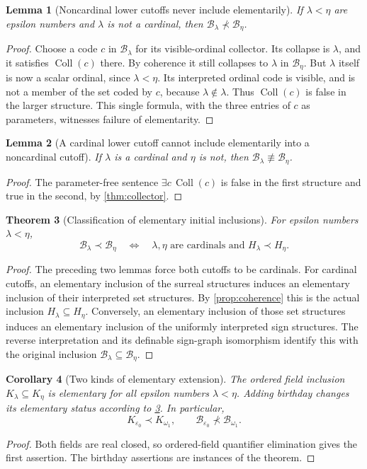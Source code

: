 \documentclass[11pt,letterpaper]{article}
\newtheorem{theorem}{Theorem}[section]
\newtheorem{lemma}[theorem]{Lemma}
\newtheorem{corollary}[theorem]{Corollary}
\theoremstyle{definition}
\theoremstyle{remark}
\newcommand{\B}{\mathcal B}
\newcommand{\Coll}{\operatorname{Coll}}
\begin{document}
\begin{lemma}[Noncardinal lower cutoffs never include elementarily]
\label{lem:lower-noncardinal}
If $\lambda<\eta$ are epsilon numbers and $\lambda$ is not a cardinal, then
$\B_\lambda\not\prec\B_\eta$.
\end{lemma}
\begin{proof}
Choose a code $c$ in $\B_\lambda$ for its visible-ordinal collector. Its
collapse is $\lambda$, and it satisfies $\Coll(c)$ there. By coherence it
still collapses to $\lambda$ in $\B_\eta$. But $\lambda$ itself is now a
scalar ordinal, since $\lambda<\eta$. Its interpreted ordinal code is
visible, and is not a member of the set coded by $c$, because
$\lambda\notin\lambda$. Thus $\Coll(c)$ is false in the larger structure.
This single formula, with the three entries of $c$ as parameters, witnesses
failure of elementarity.
\end{proof}

\begin{lemma}[A cardinal lower cutoff cannot include elementarily into a
noncardinal cutoff]
\label{lem:upper-noncardinal}
If $\lambda$ is a cardinal and $\eta$ is not, then
$\B_\lambda\not\equiv\B_\eta$.
\end{lemma}
\begin{proof}
The parameter-free sentence $\exists c\,\Coll(c)$ is false in the first
structure and true in the second, by \cref{thm:collector}.
\end{proof}

\begin{theorem}[Classification of elementary initial inclusions]
\label{thm:elementary}
For epsilon numbers $\lambda<\eta$,
\[
 \B_\lambda\prec\B_\eta
 \quad\Longleftrightarrow\quad
 \lambda,\eta\text{ are cardinals and }H_\lambda\prec H_\eta.
\]
\end{theorem}
\begin{proof}
The preceding two lemmas force both cutoffs to be cardinals. For cardinal
cutoffs, an elementary inclusion of the surreal structures induces an
elementary inclusion of their interpreted set structures. By
\cref{prop:coherence} this is the actual inclusion $H_\lambda\subseteq H_\eta$.
Conversely, an elementary inclusion of those set structures induces an
elementary inclusion of the uniformly interpreted sign structures. The
reverse interpretation and its definable sign-graph isomorphism identify this
with the original inclusion $\B_\lambda\subseteq\B_\eta$.
\end{proof}

\begin{corollary}[Two kinds of elementary extension]
The ordered field inclusion $K_\lambda\subseteq K_\eta$ is elementary for
all epsilon numbers $\lambda<\eta$. Adding birthday changes its elementary
status according to \cref{thm:elementary}. In particular,
\[
 K_{\varepsilon_0}\prec K_{\omega_1},
 \qquad
 \B_{\varepsilon_0}\not\prec\B_{\omega_1}.
\]
\end{corollary}
\begin{proof}
Both fields are real closed, so ordered-field quantifier elimination gives
the first assertion. The birthday assertions are instances of the theorem.
\end{proof}
\end{document}
